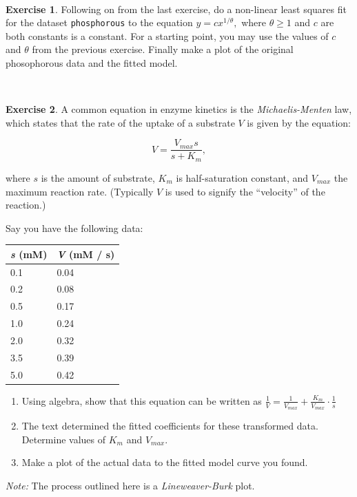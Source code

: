 \documentclass[
]{book}
\theoremstyle{definition}
\theoremstyle{definition}
\theoremstyle{definition}
\newtheorem{exercise}{Exercise}[chapter]
\theoremstyle{remark}
\begin{document}
~

\begin{exercise}
\protect\hypertarget{exr:unnamed-chunk-149}{}{\label{exr:unnamed-chunk-149} }Following on from the last exercise, do a non-linear least squares fit for the dataset \texttt{phosphorous} to the equation \(\displaystyle y = c x^{1/\theta},\) where \(\theta \geq 1\) and \(c\) are both constants is a constant. For a starting point, you may use the values of \(c\) and \(\theta\) from the previous exercise. Finally make a plot of the original phosophorous data and the fitted model.
\end{exercise}
~

\begin{exercise}
\protect\hypertarget{exr:unnamed-chunk-150}{}{\label{exr:unnamed-chunk-150} }A common equation in enzyme kinetics is the \emph{Michaelis-Menten} law, which states that the rate of the uptake of a substrate \(V\) is given by the equation:

\begin{equation}
V = \frac{V_{max} s}{s+K_{m}},
\end{equation}

where \(s\) is the amount of substrate, \(K_{m}\) is half-saturation constant, and \(V_{max}\) the maximum reaction rate. (Typically \(V\) is used to signify the ``velocity'' of the reaction.)

Say you have the following data:

\begin{longtable}[]{@{}ll@{}}
\toprule
\emph{s} (mM) & \emph{V} (mM / s) \\
\midrule
\endhead
0.1 & 0.04 \\
0.2 & 0.08 \\
0.5 & 0.17 \\
1.0 & 0.24 \\
2.0 & 0.32 \\
3.5 & 0.39 \\
5.0 & 0.42 \\
\bottomrule
\end{longtable}

\begin{enumerate}[label=\alph*.]
\item Using algebra, show that this equation can be written as $\displaystyle \frac{1}{V} = \frac{1}{V_{max}} + \frac{K_{m}}{V_{max}} \cdot \frac{1}{s}$
\item  The text determined the fitted coefficients for these transformed data.  Determine values of $K_{m}$ and $V_{max}$.
\item Make a plot of the actual data to the fitted model curve you found.
\end{enumerate}

\emph{Note:} The process outlined here is a \emph{Lineweaver-Burk} plot.
\end{exercise}
~
\end{document}
